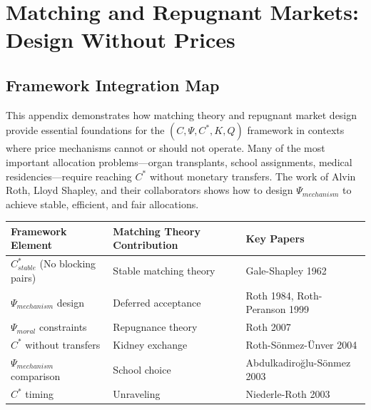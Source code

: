 \section{Matching and Repugnant Markets: Design Without Prices}
\label{app:matching-repugnant}

\subsection{Framework Integration Map}

This appendix demonstrates how matching theory and repugnant market design 
provide essential foundations for the $(C, \Psi, C^*, K, Q)$ framework in 
contexts where price mechanisms cannot or should not operate. Many of the 
most important allocation problems---organ transplants, school assignments, 
medical residencies---require reaching $C^*$ without monetary transfers. 
The work of Alvin Roth, Lloyd Shapley, and their collaborators shows how 
to design $\Psi_{mechanism}$ to achieve stable, efficient, and fair allocations.

\begin{center}
\renewcommand{\arraystretch}{1.4}
\begin{tabular}{|l|l|l|}
\hline
\textbf{Framework Element} & \textbf{Matching Theory Contribution} & \textbf{Key Papers} \\
\hline
$C^*_{stable}$ (No blocking pairs) & Stable matching theory & Gale-Shapley 1962 \\
$\Psi_{mechanism}$ design & Deferred acceptance & Roth 1984, Roth-Peranson 1999 \\
$\Psi_{moral}$ constraints & Repugnance theory & Roth 2007 \\
$C^*$ without transfers & Kidney exchange & Roth-Sönmez-Ünver 2004 \\
$\Psi_{mechanism}$ comparison & School choice & Abdulkadiroğlu-Sönmez 2003 \\
$C^*$ timing & Unraveling & Niederle-Roth 2003 \\
\hline
\end{tabular}
\end{center}

